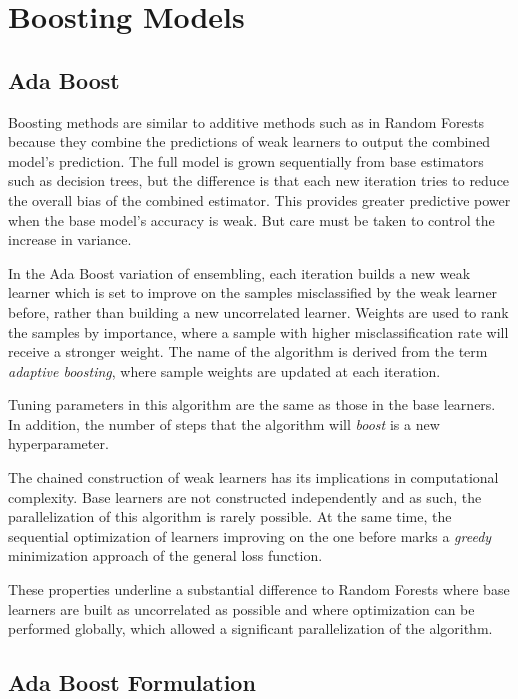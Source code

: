 
\section{Boosting Models}\label{section-boosting}
\subsection{Ada Boost}

Boosting methods are similar to additive methods such as in Random Forests because they combine the predictions of weak learners to output the combined model's prediction. The full model is grown sequentially from base estimators such as decision trees, but the difference is that each new iteration tries to reduce the overall bias of the combined estimator. This provides greater predictive power when the base model's accuracy is weak. But care must be taken to control the increase in variance.

In the Ada Boost variation of ensembling, each iteration builds a new weak learner which is set to improve on the samples misclassified by the weak learner before, rather than building a new uncorrelated learner. Weights are used to rank the samples by importance, where a sample with higher misclassification rate will receive a stronger weight. The name of the algorithm is derived from the term \textit{adaptive boosting}, where sample weights are updated at each iteration.

Tuning parameters in this algorithm are the same as those in the base learners. In addition, the number of steps that the algorithm will \textit{boost} is a new hyperparameter.

The chained construction of weak learners has its implications in computational complexity. Base learners are not constructed independently and as such, the parallelization of this algorithm is rarely possible. At the same time, the sequential optimization of learners improving on the one before marks a \textit{greedy} minimization approach of the general loss function.

These properties underline a substantial difference to Random Forests where base learners are built as uncorrelated as possible and where optimization can be performed globally, which allowed a significant parallelization of the algorithm.

\subsection{Ada Boost Formulation}

